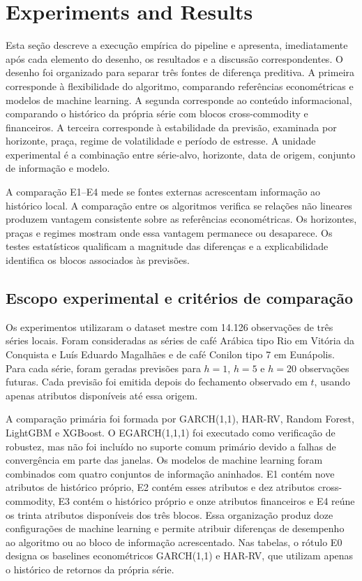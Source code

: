 \documentclass[a4paper,fleqn]{cas-sc}
\begin{document}
\section{Experiments and Results}
\label{sec:experiments}

Esta seção descreve a execução empírica do pipeline e apresenta, imediatamente após cada elemento do desenho, os resultados e a discussão correspondentes. O desenho foi organizado para separar três fontes de diferença preditiva. A primeira corresponde à flexibilidade do algoritmo, comparando referências econométricas e modelos de machine learning. A segunda corresponde ao conteúdo informacional, comparando o histórico da própria série com blocos cross-commodity e financeiros. A terceira corresponde à estabilidade da previsão, examinada por horizonte, praça, regime de volatilidade e período de estresse. A unidade experimental é a combinação entre série-alvo, horizonte, data de origem, conjunto de informação e modelo.

A comparação E1--E4 mede se fontes externas acrescentam informação ao histórico local. A comparação entre os algoritmos verifica se relações não lineares produzem vantagem consistente sobre as referências econométricas. Os horizontes, praças e regimes mostram onde essa vantagem permanece ou desaparece. Os testes estatísticos qualificam a magnitude das diferenças e a explicabilidade identifica os blocos associados às previsões.

\subsection{Escopo experimental e critérios de comparação}
\label{subsec:experimental_scope}

Os experimentos utilizaram o dataset mestre com 14.126 observações de três séries locais. Foram consideradas as séries de café Arábica tipo Rio em Vitória da Conquista e Luís Eduardo Magalhães e de café Conilon tipo 7 em Eunápolis. Para cada série, foram geradas previsões para \(h=1\), \(h=5\) e \(h=20\) observações futuras. Cada previsão foi emitida depois do fechamento observado em \(t\), usando apenas atributos disponíveis até essa origem.

A comparação primária foi formada por GARCH(1,1), HAR-RV, Random Forest, LightGBM e XGBoost. O EGARCH(1,1,1) foi executado como verificação de robustez, mas não foi incluído no suporte comum primário devido a falhas de convergência em parte das janelas. Os modelos de machine learning foram combinados com quatro conjuntos de informação aninhados. E1 contém nove atributos de histórico próprio, E2 contém esses atributos e dez atributos cross-commodity, E3 contém o histórico próprio e onze atributos financeiros e E4 reúne os trinta atributos disponíveis dos três blocos. Essa organização produz doze configurações de machine learning e permite atribuir diferenças de desempenho ao algoritmo ou ao bloco de informação acrescentado. Nas tabelas, o rótulo E0 designa os baselines econométricos GARCH(1,1) e HAR-RV, que utilizam apenas o histórico de retornos da própria série.
\end{document}

